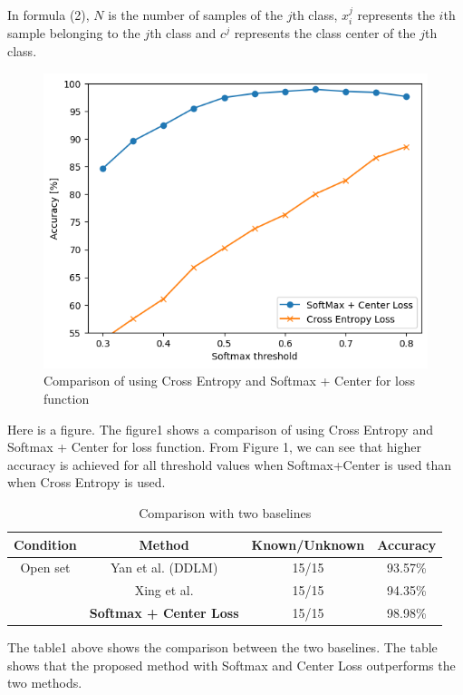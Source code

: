 \documentclass[dvipdfmx]{article}
\begin{document}
In formula (2), $N$ is the number of samples of the $j$th class, $x_i^j$ represents the $i$th sample belonging to the $j$th class and $c^j$ represents the class center of the $j$th class.


\begin{figure}[H]
\begin{center}
\includegraphics[width=\linewidth]{./img/soft_center.png}
\end{center}
\caption{Comparison of using Cross Entropy and Softmax + Center for loss function}
\end{figure}

Here is a figure. The figure1 shows a comparison of using Cross Entropy and Softmax + Center for loss function.
From Figure 1, we can see that higher accuracy is achieved for all threshold values when Softmax+Center is used than when Cross Entropy is used.

\begin{table}[H]
\caption{Comparison with two baselines}
\centering
\begin{tabular}{cccc}
\hline
Condition & Method & Known/Unknown & Accuracy \\
\hline
Open set & Yan et al.\cite{ddlm} (DDLM) & 15/15 & 93.57\% \\
& Xing et al.\cite{xing} & 15/15 & 94.35\% \\
& \textbf{Softmax + Center Loss} & 15/15 & 98.98\% \\
\hline
\end{tabular}
\end{table}

The table1 above shows the comparison between the two baselines. The table shows that the proposed method with Softmax and Center Loss outperforms the two methods.
\end{document}
